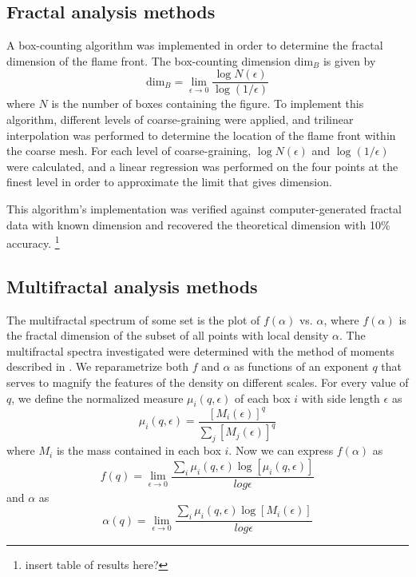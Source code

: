 \documentclass[iop]{emulateapj}
\begin{document}
\subsection{Fractal analysis methods}\label{FractalMethods}
A box-counting algorithm was implemented in order to determine the fractal dimension of the flame front. The box-counting dimension $\mathrm{dim}_B$ is given by
\begin{equation}
	\mathrm{dim}_B = \lim_{\epsilon \to 0} \frac{\log N(\epsilon)}{\log (1 / \epsilon)}
\end{equation}
where $N$ is the number of boxes containing the figure.  To implement this algorithm, different levels of coarse-graining were applied, and trilinear interpolation was performed to determine the location of the flame front within the coarse mesh. For each level of coarse-graining, $\log{N(\epsilon)}$ and $\log{(1/\epsilon)}$ were calculated, and a linear regression was performed on the four points at the finest level in order to approximate the limit that gives dimension.

This algorithm’s implementation was verified against computer-generated fractal data with known dimension and recovered the theoretical dimension with 10\% accuracy. \footnote{insert table of results here?}

\subsection{Multifractal analysis methods}\label{MultifractalMethods}
The multifractal spectrum of some set is the plot of $f(\alpha)$ vs. $\alpha$, where $f(\alpha)$ is the fractal dimension of the subset of all points with local density $\alpha$. The multifractal spectra investigated were determined with the method of moments described in \cite{Chhabra1989}. We reparametrize both $f$ and $\alpha$ as functions of an exponent $q$ that serves to magnify the features of the density on different scales. For every value of $q$, we define the normalized measure $\mu_i(q, \epsilon)$ of each box $i$ with side length $\epsilon$ as
\begin{equation} 
	\mu_i(q, \epsilon) = \frac{[M_i(\epsilon)]^q}{\sum_j[M_j(\epsilon)]^q}
\end{equation}
where $M_i$ is the mass contained in each box $i$. Now we can express $f(\alpha)$ as
\begin{equation}
	f(q) = \lim_{\epsilon \to 0} \frac{\sum_i \mu_i(q, \epsilon) \log[\mu_i(q, \epsilon)]}{log \epsilon}
\end{equation}
and $\alpha$ as
\begin{equation}
	\alpha (q) = \lim_{\epsilon \to 0} \frac{\sum_i \mu_i(q, \epsilon) \log[M_i(\epsilon)]}{log \epsilon}
\end{equation}
\end{document}
